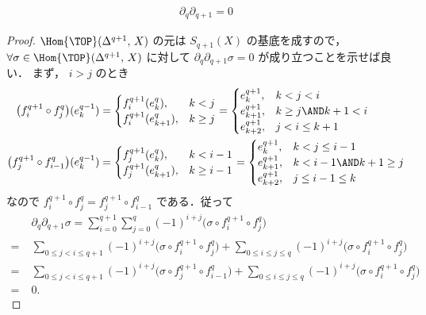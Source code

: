 \documentclass[algtopo_main]{subfiles}
\begin{document}
\begin{mylem}[label=lem:SC-nilpo]{}
    \begin{align}
        \partial_q\partial_{q+1} = 0
    \end{align}
\end{mylem}

\begin{proof}
    $\Hom{\TOP}(\Delta^{q+1},\, X)$ の元は $S_{q+1}(X)$ の基底を成すので，$\forall \sigma \in \Hom{\TOP}(\Delta^{q+1},\, X)$ に対して $\partial_q \partial_{q+1} \sigma = 0$ が成り立つことを示せば良い．
    まず， $i > j$ のとき
    \begin{align}
        \bigl(f_i^{q+1} \circ f_j^q\bigr)(e_k^{q-1}) &= 
        \begin{cases}
            f_i^{q+1}(e_k^q), & k < j \\
            f_i^{q+1}(e_{k+1}^q), & k \ge j
        \end{cases}
        = 
        \begin{cases}
            e_k^{q+1}, & k < j < i \\
            e_{k+1}^{q+1}, & k \ge j \AND k+1 < i \\
            e_{k+2}^{q+1}, & j < i \le k+1
        \end{cases} \\
        \bigl(f_j^{q+1} \circ f_{i-1}^q\bigr)(e_k^{q-1}) &= 
        \begin{cases}
            f_j^{q+1}(e_k^q), & k < i-1 \\
            f_j^{q+1}(e_{k+1}^q), & k \ge i-1
        \end{cases}
        = 
        \begin{cases}
            e_k^{q+1}, & k < j \le i-1 \\
            e_{k+1}^{q+1}, & k < i-1 \AND k+1 \ge j \\
            e_{k+2}^{q+1}, & j \le i-1 \le k
        \end{cases} 
    \end{align}
    なので $f_i^{q+1} \circ f_j^q =f_j^{q+1} \circ f_{i-1}^q$ である．従って
    \begin{align}
        &\partial_q \partial_{q+1} \sigma = \sum_{i=0}^{q+1} \sum_{j=0}^q (-1)^{i+j} \bigl(\sigma \circ f^{q+1}_i \circ f^q_j\bigr)\\
        =\;& \sum_{0\le j<i\le q+1} (-1)^{i+j} \bigl(\sigma \circ f_i^{q+1} \circ f^{q}_j\bigr) + \sum_{0\le i \le j\le q} (-1)^{i+j} \bigl(\sigma \circ f_i^{q+1} \circ f^{q}_j\bigr) \\
        =\;& \sum_{0\le j<i\le q+1} (-1)^{i+j} \bigl(\sigma \circ f_j^{q+1} \circ f^{q}_{i-1}\bigr) + \sum_{0\le i \le j\le q} (-1)^{i+j} \bigl(\sigma \circ f_i^{q+1} \circ f^{q}_j\bigr) \\
        =\;&0.
    \end{align}
\end{proof}
\end{document}
